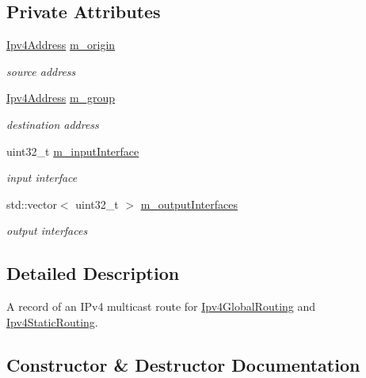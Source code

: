 \subsection*{Private Attributes}
\begin{DoxyCompactItemize}
\item 
\hyperlink{classns3_1_1Ipv4Address}{Ipv4\+Address} \hyperlink{classns3_1_1Ipv4MulticastRoutingTableEntry_a342b1ce482d42978451b4df62b8b4078}{m\+\_\+origin}
\begin{DoxyCompactList}\small\item\em source address \end{DoxyCompactList}\item 
\hyperlink{classns3_1_1Ipv4Address}{Ipv4\+Address} \hyperlink{classns3_1_1Ipv4MulticastRoutingTableEntry_a789ff7205247eac010152736d0860496}{m\+\_\+group}
\begin{DoxyCompactList}\small\item\em destination address \end{DoxyCompactList}\item 
uint32\+\_\+t \hyperlink{classns3_1_1Ipv4MulticastRoutingTableEntry_af513439f1e8601fbe93541c2d70a5945}{m\+\_\+input\+Interface}
\begin{DoxyCompactList}\small\item\em input interface \end{DoxyCompactList}\item 
std\+::vector$<$ uint32\+\_\+t $>$ \hyperlink{classns3_1_1Ipv4MulticastRoutingTableEntry_a69118bb9f1092643d77e4326d3de0721}{m\+\_\+output\+Interfaces}
\begin{DoxyCompactList}\small\item\em output interfaces \end{DoxyCompactList}\end{DoxyCompactItemize}


\subsection{Detailed Description}
A record of an I\+Pv4 multicast route for \hyperlink{classns3_1_1Ipv4GlobalRouting}{Ipv4\+Global\+Routing} and \hyperlink{classns3_1_1Ipv4StaticRouting}{Ipv4\+Static\+Routing}. 

\subsection{Constructor \& Destructor Documentation}
